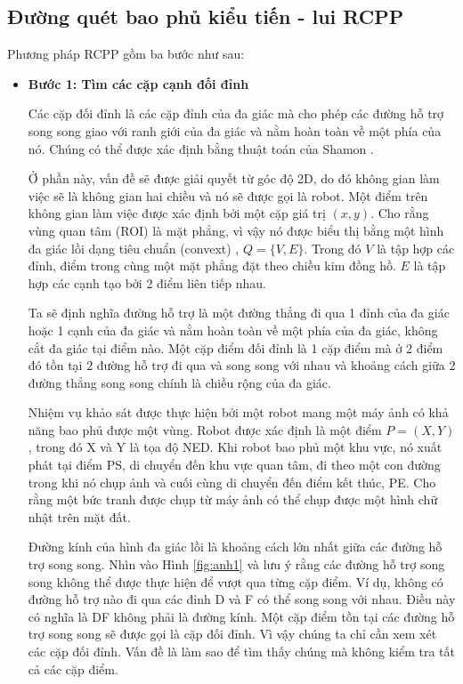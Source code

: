 \subsection{Đường quét bao phủ kiểu tiến - lui RCPP}
\label{sec:sea}
Phương pháp RCPP gồm ba bước như sau:
\begin{itemize}
    \item \textbf{Bước 1: Tìm các cặp cạnh đối đỉnh}
    
    Các cặp đối đỉnh là các cặp đỉnh của đa giác mà cho phép các đường hỗ trợ song song giao với ranh giới của đa giác và nằm hoàn toàn về một phía của nó. Chúng có thể được xác định bằng thuật toán của Shamon \cite{shamos1978computational}.

Ở phần này, vấn đề sẽ được giải quyết từ góc độ 2D, do đó không gian làm việc sẽ là không gian hai chiều và nó sẽ được gọi là robot. Một điểm trên không gian làm việc được xác định bởi một cặp giá trị $(x, y)$. Cho rằng vùng quan tâm (ROI) là mặt phẳng, vì vậy nó được biểu thị bằng một hình đa giác lồi dạng tiêu chuẩn (convext) \cite{10.1007/11841036_57}, $Q = \{ V, E \}$. Trong đó $V$ là tập hợp các đỉnh, điểm trong cùng một mặt phẳng đặt theo chiều kim đồng hồ. $E$ là tập hợp các cạnh tạo bởi 2 điểm liên tiếp nhau.

Ta sẽ định nghĩa đường hỗ trợ là một đường thẳng đi qua 1 đỉnh của đa giác hoặc 1 cạnh của đa giác và nằm hoàn toàn về một phía của đa giác, không cắt đa giác tại điểm nào. Một cặp điểm đối đỉnh là 1 cặp điểm mà ở 2 điểm đó tồn tại 2 đường hỗ trợ đi qua và song song với nhau và khoảng cách giữa 2 đường thẳng song song chính là chiều rộng của đa giác.

Nhiệm vụ khảo sát được thực hiện bởi một robot mang một máy ảnh có khả năng bao phủ được một vùng. Robot được xác định là một điểm $P = (X, Y)$, trong đó X và Y là tọa độ NED. Khi robot bao phủ một khu vực, nó xuất phát tại điểm PS, di chuyển đến khu vực quan tâm, đi theo một con đường trong khi nó chụp ảnh và cuối cùng di chuyển đến điểm kết thúc, PE. Cho rằng một bức tranh được chụp từ máy ảnh có thể chụp được một hình chữ nhật trên mặt đất.

Đường kính của hình đa giác lồi là khoảng cách lớn nhất giữa các đường hỗ trợ song song. Nhìn vào Hình \ref{fig:anh1} và lưu ý rằng các đường hỗ trợ song song không thể được thực hiện để vượt qua từng cặp điểm. Ví dụ, không có đường hỗ trợ nào đi qua các đỉnh D và F có thể song song với nhau. Điều này có nghĩa là DF không phải là đường kính. Một cặp điểm tồn tại các đường hỗ trợ song song sẽ được gọi là cặp đối đỉnh. Vì vậy chúng ta chỉ cần xem xét các cặp đối đỉnh. Vấn đề là làm sao để tìm thấy chúng mà không kiểm tra tất cả các cặp điểm.


\end{itemize}

